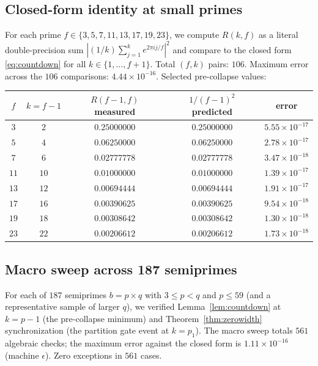 \documentclass[11pt,reqno]{amsart}
\theoremstyle{plain}
\theoremstyle{definition}
\theoremstyle{remark}
\begin{document}
\subsection{Closed-form identity at small primes}

For each prime $f \in \{3, 5, 7, 11, 13, 17, 19, 23\}$, we
compute $R(k, f)$ as a literal double-precision sum
$|(1/k) \sum_{j=1}^{k} e^{2\pi i j / f}|^2$ and compare to the
closed form \eqref{eq:countdown} for all $k \in \{1, \ldots, f+1\}$.
Total $(f, k)$ pairs: $106$. Maximum error across the
$106$ comparisons: $4.44 \times 10^{-16}$. Selected pre-collapse
values:
\begin{center}
\begin{tabular}{c|c|c|c|c}
\toprule
$f$ & $k = f - 1$ & $R(f-1, f)$ measured & $1 / (f-1)^2$ predicted & error \\
\midrule
$3$  & $2$  & $0.25000000$  & $0.25000000$  & $5.55 \times 10^{-17}$ \\
$5$  & $4$  & $0.06250000$  & $0.06250000$  & $2.78 \times 10^{-17}$ \\
$7$  & $6$  & $0.02777778$  & $0.02777778$  & $3.47 \times 10^{-18}$ \\
$11$ & $10$ & $0.01000000$  & $0.01000000$  & $1.39 \times 10^{-17}$ \\
$13$ & $12$ & $0.00694444$  & $0.00694444$  & $1.91 \times 10^{-17}$ \\
$17$ & $16$ & $0.00390625$  & $0.00390625$  & $9.54 \times 10^{-18}$ \\
$19$ & $18$ & $0.00308642$  & $0.00308642$  & $1.30 \times 10^{-18}$ \\
$23$ & $22$ & $0.00206612$  & $0.00206612$  & $1.73 \times 10^{-18}$ \\
\bottomrule
\end{tabular}
\end{center}

\subsection{Macro sweep across 187 semiprimes}

For each of $187$ semiprimes $b = p \times q$ with $3 \le p < q$
and $p \le 59$ (and a representative sample of larger $q$), we
verified Lemma~\ref{lem:countdown} at $k = p - 1$ (the
pre-collapse minimum) and Theorem~\ref{thm:zerowidth}
synchronization (the partition gate event at $k = p_1$). The
macro sweep totals $561$ algebraic checks; the maximum error
against the closed form is $1.11 \times 10^{-16}$ (machine
$\epsilon$). Zero exceptions in $561$ cases.
\end{document}
